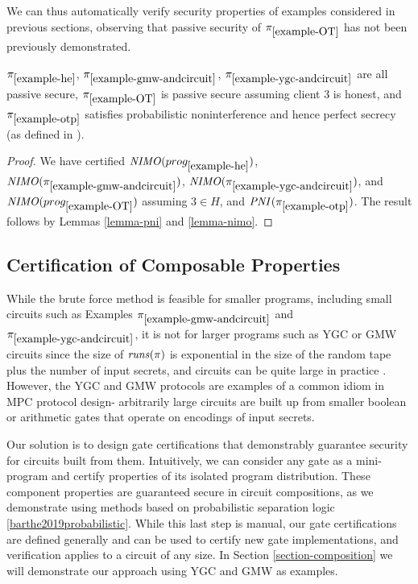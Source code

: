 We can thus automatically verify security properties of examples considered
in previous sections, observing that passive security of $\pi_{\ref{example-OT}}$
has not been previously demonstrated.
\begin{lemma}
  $\pi_{\ref{example-he}}$, $\pi_{\ref{example-gmw-andcircuit}}$,
  $\pi_{\ref{example-ygc-andcircuit}}$ are all passive secure,
  $\pi_{\ref{example-OT}}$ is passive secure assuming client 3 is
  honest, and $\pi_{\ref{example-otp}}$ satisfies probabilistic
  noninterference and hence perfect secrecy (as defined in
  \cite{barthe2019probabilistic}).
\end{lemma}
\begin{proof}
  We have certified $\mathit{NIMO}(prog_{\ref{example-he}})$, $\mathit{NIMO}(\pi_{\ref{example-gmw-andcircuit}})$,
  $\mathit{NIMO}(\pi_{\ref{example-ygc-andcircuit}})$, and $\mathit{NIMO}(prog_{\ref{example-OT}})$ assuming
  $3 \in H$, and $\mathit{PNI}(\pi_{\ref{example-otp}})$. The result follows by Lemmas
  \ref{lemma-pni} and \ref{lemma-nimo}.
\end{proof}

\subsection{Certification of Composable Properties}
\label{section-automation-intensional}

While the brute force method is feasible for smaller programs,
including small circuits such as Examples
$\pi_{\ref{example-gmw-andcircuit}}$ and
$\pi_{\ref{example-ygc-andcircuit}}$, it is not for larger programs
such as YGC or GMW circuits since the size of $\mathit{runs}(\pi)$ is
exponential in the size of the random tape plus the number of input
secrets, and circuits can be quite large in practice
\cite{kreuter2012billion}.  However, the YGC and GMW protocols are
examples of a common idiom in MPC protocol design- arbitrarily large
circuits are built up from smaller boolean or arithmetic gates that
operate on encodings of input secrets.

Our solution is to design gate certifications that demonstrably
guarantee security for circuits built from them. Intuitively, we can
consider any gate as a mini-program and certify properties
of its isolated program distribution. These component properties are
guaranteed secure in circuit compositions, as we demonstrate using
methods based on probabilistic separation logic
\ref{barthe2019probabilistic}. While this last step is manual, our
gate certifications are defined generally and can be used to certify
new gate implementations, and verification applies to a circuit of any
size. In Section \ref{section-composition} we will demonstrate our
approach using YGC and GMW as examples.

